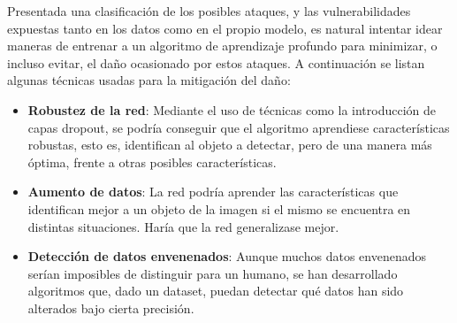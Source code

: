 Presentada una clasificación de los posibles ataques, y las vulnerabilidades expuestas tanto en los datos como en el propio modelo, es natural intentar idear maneras de entrenar a un algoritmo de aprendizaje profundo para minimizar, o incluso evitar, el daño ocasionado por estos ataques. A continuación se listan algunas técnicas usadas para la mitigación del daño:
\begin{itemize}
	\item \textbf{Robustez de la red}: Mediante el uso de técnicas como la introducción de capas dropout, se podría conseguir que el algoritmo aprendiese características robustas, esto es, identifican al objeto a detectar, pero de una manera más óptima, frente a otras posibles características.
	\item \textbf{Aumento de datos}: La red podría aprender las características que identifican mejor a un objeto de la imagen si el mismo se encuentra en distintas situaciones. Haría que la red generalizase mejor.
	\item \textbf{Detección de datos envenenados}: Aunque muchos datos envenenados serían imposibles de distinguir para un humano, se han desarrollado algoritmos que, dado un dataset, puedan detectar qué datos han sido alterados bajo cierta precisión.
\end{itemize}

\endinput

